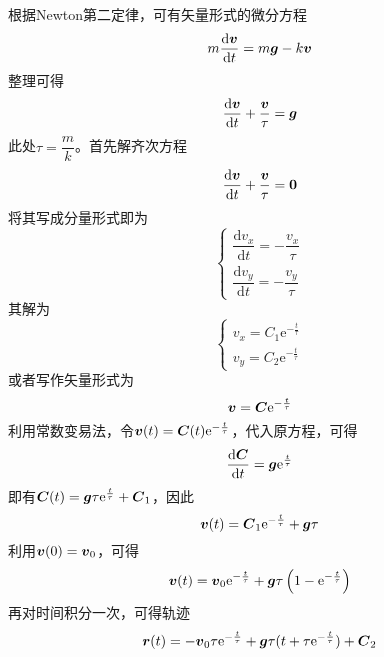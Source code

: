 \begin{solution}
根据Newton第二定律，可有矢量形式的微分方程
\begin{equation*}
	m\frac{\mathrm{d} \boldsymbol{v}}{\mathrm{d} t} = m\boldsymbol{g} - k\boldsymbol{v}
\end{equation*}
整理可得
\begin{equation*}
	\frac{\mathrm{d} \boldsymbol{v}}{\mathrm{d} t} + \frac{\boldsymbol{v}}{\tau} = \boldsymbol{g}
\end{equation*}
此处$\tau = \dfrac{m}{k}$。首先解齐次方程
\begin{equation*}
	\frac{\mathrm{d} \boldsymbol{v}}{\mathrm{d} t} + \frac{\boldsymbol{v}}{\tau} = \boldsymbol{0}
\end{equation*}
将其写成分量形式即为
\begin{equation*}
	\begin{cases}
		\dfrac{\mathrm{d} v_x}{\mathrm{d} t} = -\dfrac{v_x}{\tau} \\[1.5ex]
		\dfrac{\mathrm{d} v_y}{\mathrm{d} t} = -\dfrac{v_y}{\tau}
	\end{cases}
\end{equation*}
其解为
\begin{equation*}
	\begin{cases}
		v_x = C_1 \mathrm{e}^{-\frac{t}{\tau}} \\
		v_y = C_2 \mathrm{e}^{-\frac{t}{\tau}}
	\end{cases}
\end{equation*}
或者写作矢量形式为
\begin{equation*}
	\boldsymbol{v} = \boldsymbol{C} \mathrm{e}^{-\frac{t}{\tau}}
\end{equation*}
利用常数变易法，令$\boldsymbol{v}(t) = \boldsymbol{C}(t) \mathrm{e}^{-\frac{t}{\tau}}$，代入原方程，可得
\begin{equation*}
	\frac{\mathrm{d} \boldsymbol{C}}{\mathrm{d} t} = \boldsymbol{g}\mathrm{e}^{\frac{t}{\tau}}
\end{equation*}
即有$\boldsymbol{C}(t) = \boldsymbol{g}\tau \mathrm{e}^{\frac{t}{\tau}} + \boldsymbol{C}_1$，因此
\begin{equation*}
	\boldsymbol{v}(t) = \boldsymbol{C}_1 \mathrm{e}^{-\frac{t}{\tau}} + \boldsymbol{g} \tau
\end{equation*}
利用$\boldsymbol{v}(0) = \boldsymbol{v}_0$，可得
\begin{equation*}
	\boldsymbol{v}(t) = \boldsymbol{v}_0 \mathrm{e}^{-\frac{t}{\tau}} + \boldsymbol{g}\tau \left(1-\mathrm{e}^{-\frac{t}{\tau}}\right)
\end{equation*}
再对时间积分一次，可得轨迹
\begin{equation*}
	\mbf{r}(t) = -\mbf{v}_0 \tau \mathrm{e}^{-\frac{t}{\tau}} + \mbf{g}\tau(t + \tau \mathrm{e}^{-\frac{t}{\tau}}) + \mbf{C}_2

\end{equation*}
\end{solution}
